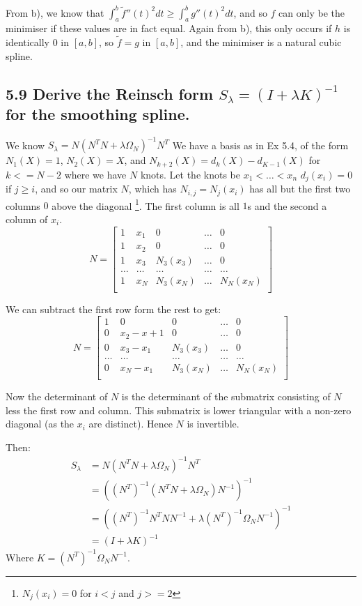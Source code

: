From b), we know that $\int_a^b \tilde{f}''(t)^2 dt \geq \int_a^b g''(t)^2 dt$, and so $f$ can only be the minimiser if these values are in fact equal.
Again from b), this only occurs if $h$ is identically $0$ in $[a,b]$, so $\tilde{f} = g$ in $[a,b]$, and the minimiser is a natural cubic spline.


\subsection*{5.9 Derive the Reinsch form $S_\lambda = \left(I + \lambda K\right) ^{-1}$ for the smoothing spline.}

We know $S_\lambda = N\left(N^T N + \lambda \Omega_N\right)^{-1}N^T$
We have a basis as in Ex 5.4, of the form $N_1(X) = 1$, $N_2(X) = X$, and $N_{k+2}(X) = d_k(X) - d_{K-1}(X)$ for $k <= N-2$ where we have $N$ knots. Let the knots be $x_1 < \dots < x_n$
$d_j(x_i) = 0$ if $j \geq i$, and so our matrix $N$, which has $N_{i,j} = N_j(x_i)$ has all but the first two columns $0$ above the diagonal \footnote{$N_j(x_i) = 0 $ for $i < j$ and $j >= 2$}.
The first column is all $1$s and the second a column of $x_i$.
$$
N = \begin{bmatrix}
1 & x_1 & 0 & \dots & 0\\
1 & x_2 & 0 & \dots & 0\\
1 & x_3 & N_3(x_3) & \dots & 0\\
\dots & \dots & \dots & \dots & \dots\\
1 & x_N & N_3(x_N) & \dots & N_N(x_N)\\
\end{bmatrix}
$$

We can subtract the first row form the rest to get:
$$
N = \begin{bmatrix}
1 & 0 & 0 & \dots & 0\\
0 & x_2 - x+1 & 0 & \dots & 0\\
0 & x_3 - x_1 & N_3(x_3) & \dots & 0\\
\dots & \dots & \dots & \dots & \dots\\
0 & x_N - x_1 & N_3(x_N) & \dots & N_N(x_N)\\
\end{bmatrix}
$$

Now the determinant of $N$ is the determinant of the submatrix consisting of $N$ less the first row and column.
This submatrix is lower triangular with a non-zero diagonal (as the $x_i$ are distinct).
Hence $N$ is invertible.

Then:
\begin{align*}
S_\lambda &= N\left(N^T N + \lambda \Omega_N\right)^{-1}N^T  \\
&= \left((N^T)^{-1} \left( N^T N + \lambda \Omega_N \right) N^{-1}\right)^{-1} \\
&= \left((N^T)^{-1} N^T N N^{-1} + \lambda (N^T)^{-1} \Omega_N  N^{-1}\right)^{-1} \\
&= \left(I + \lambda K \right)^{-1} 
\end{align*}
Where $K = (N^T)^{-1} \Omega_N  N^{-1}$.

